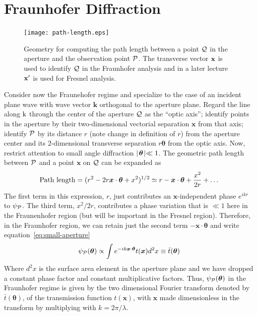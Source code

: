 \section{Fraunhofer Diffraction}

\begin{figure}[th!]
	\centering
	\texttt{[image: path-length.eps]}
  \caption{Geometry for computing the path length between a point $\cal{Q}$ in 
the aperture and the observation point $\cal{P}$. The transverse vector 
$\bf{x}$ is used to identify $\cal{Q}$ in the Fraunhofer analysis and in a
later lecture $\bf{x'}$ is used for Fresnel analysis.}
  \label{fig:path-length}
\end{figure}

Consider now the Fraunehofer regime and specialize to the case of an incident plane wave with
 wave vector ${\bm k}$ orthogonal to the aperture plane. Regard the line along ${\rm k}$ through
the center of the aperture ${\cal Q}$ as the ``optic axis''; identify points in the aperture by
their two-dimensional vectorial separation ${\bm x}$ from that axis; identify ${\cal P}$ by 
its distance $r$  (note change in definition of $r$) 
from the aperture center and its 2-dimensional transverse separation 
$r{\bm\theta}$ from the optic axis. Now, restrict attention to small angle diffraction
$\mid\!{\bm\theta}\!\mid\ll 1$. The geometric path length between ${\cal P}$ and a point ${\bm x}$ on 
${\cal Q}$ can be expanded as
\[
{\rm Path~length}=(r^2-2r{\bm x}\cdot{\bm\theta}+x^2)^{1/2}
       \simeq r-{\bm x}\cdot{\bm\theta}+{x^2\over 2r}+\ldots
\]
The first term in this expression, $r$, just contributes an ${\bm x}$-independent phase
$e^{ikr}$ to $\psi_{\cal P}$. The third term, ${x^2/2r}$, contributes a phase variation that is
$\ll 1$ here in the Fraunenhofer region (but will be important in the Fresnel region). Therefore, 
in the Fraunhofer region, we can retain just the second term $-{\bm x}\cdot{\bm\theta}$ and
write equation~\ref{eq:small-aperture} 
\[
\psi_{\cal P}({\bm\theta})\propto\int e^{-ik{\bm x}\cdot{\bm\theta}}t({\bm x})d^2x
     \equiv\bar{t}({\bm\theta})
\]
Where $d^2x$ is the surface area element in the aperture plane and we have dropped a constant
phase factor and constant multiplicative factors. Thus, $\psi_{\cal P}({\bm\theta})$ in the 
Fraunhofer regime is given by the two dimensional Fourier transform denoted by 
$\bar{t}({\bm\theta})$, of the transmission function $t({\bm x})$, with ${\bm x}$ made 
dimensionless in the transform by multiplying with $k={2\pi/\lambda}$. 

